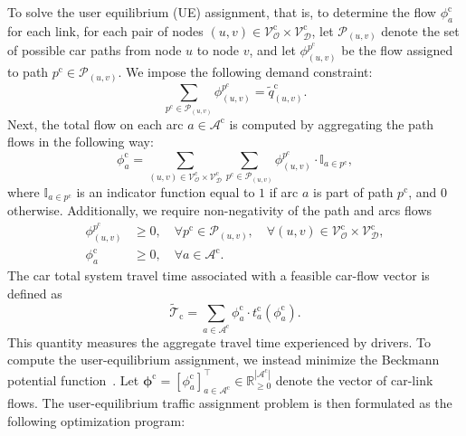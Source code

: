 \documentclass[lettersize,journal]{IEEEtran}
\begin{document}
To solve the user equilibrium (UE) assignment, that is, to determine the flow $\phi_{a}^\mathrm{c}$ for each link, for each pair of nodes $(u, v) \in \mathcal{V}_{\mathcal{O}}^\mathrm{c}\times \mathcal{V}_{\mathcal{D}}^\mathrm{c}$, let $\mathcal{P}_{(u,v)}$ denote the set of possible car paths from node $u$ to node $v$, and let $\phi_{(u,v)}^{p^\mathrm{c}}$ be the flow assigned to path $p^\mathrm{c} \in \mathcal{P}_{(u,v)}$. We impose the following demand constraint:
\begin{equation}
\label{t_a_m_1}
    \sum_{p^\mathrm{c}\in \mathcal{P}_{(u,v)}} \phi_{(u,v)}^{p^\mathrm{c}} = \tilde{q}_{(u,v)}^\mathrm{c}.
\end{equation}
Next, the total flow on each arc $a \in \mathcal{A}^\mathrm{c}$ is computed by aggregating the path flows in the following way:
\begin{equation}
\label{t_a_m_2}
    \phi_{a}^\mathrm{c} = \sum_{(u, v) \in \mathcal{V}_{\mathcal{O}}^\mathrm{c}\times \mathcal{V}_{\mathcal{D}}^\mathrm{c}} \sum_{p^\mathrm{c} \in \mathcal{P}_{(u,v)}} \phi_{(u,v)}^{p^\mathrm{c}} \cdot \mathbb{I}_{a \in p^\mathrm{c}} ,
\end{equation}
where $\mathbb{I}_{a \in p^\mathrm{c}}$ is an indicator function equal to $1$ if arc $a$ is part of path $p^\mathrm{c}$, and $0$ otherwise. Additionally, we require non-negativity of the path and arcs flows
\begin{align}
    \label{t_a_m_3_1}
    \phi_{(u,v)}^{p^\mathrm{c}} & \geq 0, \quad \forall p^\mathrm{c} \in \mathcal{P}_{(u,v)}, \quad \forall (u, v) \in \mathcal{V}_{\mathcal{O}}^\mathrm{c}\times \mathcal{V}_{\mathcal{D}}^\mathrm{c}, \\
    \label{t_a_m_3_2}
    \phi_{a}^\mathrm{c} & \geq 0, \quad \forall a \in \mathcal{A}^\mathrm{c}.
\end{align}
The car total system travel time associated with a feasible car-flow vector is defined as
\begin{equation}
    \tilde{\mathcal{T}}_\mathrm{c}
    =
    \sum_{a \in \mathcal{A}^\mathrm{c}}
    \phi^\mathrm{c}_{a} \cdot t_a^\mathrm{c}(\phi_{a}^\mathrm{c}).
\end{equation}
This quantity measures the aggregate travel time experienced by drivers. To compute the user-equilibrium assignment, we instead minimize the Beckmann potential function~\cite{beckmann1952lagrangian}. Let
$\boldsymbol{\phi}^\mathrm{c}
=
[\phi^\mathrm{c}_{a}]_{a \in \mathcal{A}^\mathrm{c}}^\top
\in \mathbb{R}_{\geq 0}^{|\mathcal{A}^\mathrm{c}|}$
denote the vector of car-link flows. The user-equilibrium traffic assignment problem is then formulated as the following optimization program:
\end{document}
